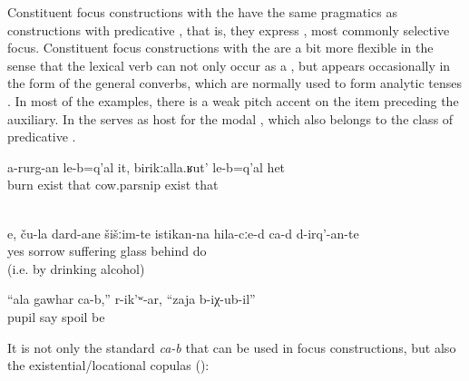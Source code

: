 Constituent focus constructions with the  have the same pragmatics as constructions with predicative , that is, they express , most commonly selective focus. Constituent focus constructions with the  are a bit more flexible in the sense that the lexical verb can not only occur as a , but appears occasionally in the form of the general converbs, which are normally used to form analytic tenses . In most of the examples, there is a weak pitch accent on the item preceding the auxiliary. In  the  serves as host for the modal  , which also belongs to the class of predicative .


\begin{exe}
	\ex	\label{ex:There is the one that does not burn, the cow-parsnip@25}
	\gll	a-rurg-an	le-b=q'al	it,	birikːalla.ʁut'	le-b=q'al	het\\
		burn	exist	that	cow.parsnip	exist	that\\
	\glt	{}

	\\\label{ex:Yes, they resolve their sorrows BEHIND THE GLASS@25b}
	\gll	e,	ču-la	dard-ane	šišːim-te	istikan-na	hila-cːe-d	ca-d 		d-irq'-an-te\\
		yes		sorrow	suffering	glass	behind		 	do\\
	\glt	{} (i.e. by drinking alcohol)
	
		\ex	\label{ex:‎Your pupil is spoiled, she said}
	\gll	``ala	gawhar	ca-b,''	r-ik'ʷ-ar, ``zaja	b-iχ-ub-il''\\
			pupil		say	spoil	be\\
	\glt	{}
\end{exe}

It is not only the standard  \textit{ca-b} that can be used in focus constructions, but also the existential/locational copulas ():

